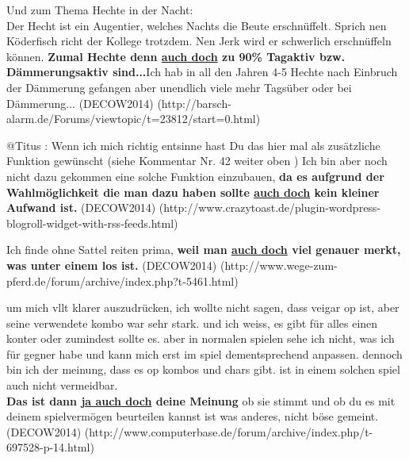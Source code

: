 {\begin{exe}
	\ex\label{1181} 
	\scriptsize
	Und zum Thema Hechte in der Nacht:\\
	Der Hecht ist ein Augentier, welches Nachts die Beute erschnüffelt. Sprich nen Köderfisch richt der Kollege trotzdem. Nen Jerk wird er schwerlich 			erschnüffeln können. \textbf{Zumal Hechte denn \underline{auch doch} zu 90\% Tagaktiv bzw. Dämmerungsaktiv sind...}Ich hab in all den Jahren 4-5 Hechte 	nach Einbruch der Dämmerung gefangen aber unendlich viele mehr Tagsüber oder bei Dämmerung...
	\newline
	\hbox{}\hfill\hbox{(DECOW2014)}	
	\newline
	\hbox{}\hfill\hbox{(http://barsch-alarm.de/Forums/viewtopic/t=23812/start=0.html)}
\end{exe}						  
						
\begin{exe}
	\ex\label{1182} 
	\scriptsize
	@Titus : Wenn ich mich richtig entsinne hast Du das hier mal als zusätzliche Funktion gewünscht (siehe Kommentar Nr. 42 weiter oben ) Ich bin aber noch 	nicht dazu gekommen eine solche Funktion einzubauen, \textbf{da es aufgrund der Wahlmöglichkeit die man dazu haben sollte \underline{auch doch} kein 		kleiner Aufwand ist.} 
	\hfill\hbox{(DECOW2014)}	
	\newline
	\hbox{}\hfill\hbox{(http://www.crazytoast.de/plugin-wordpress-blogroll-widget-with-rss-feeds.html)}
\end{exe}	

\begin{exe}
	\ex\label{1183} 
	\scriptsize
	Ich finde ohne Sattel reiten prima, \textbf{weil man \underline{auch doch} viel genauer merkt, was unter einem los ist.} 
	\hfill\hbox{(DECOW2014)}	
	\newline
	\hbox{}\hfill\hbox{(http://www.wege-zum-pferd.de/forum/archive/index.php?t-5461.html)}
\end{exe}	

\begin{exe}
	\ex\label{1184} 
	\scriptsize
	um mich vllt klarer auszudrücken, ich wollte nicht sagen, dass veigar op ist, aber seine verwendete kombo war sehr stark. und ich weiss, es gibt für 		alles einen konter oder zumindest sollte es. aber in normalen spielen sehe ich nicht, was ich für gegner habe und kann mich erst im spiel 					dem\-entsprechend anpassen. dennoch bin ich der meinung, dass es op kombos und chars gibt. ist in einem solchen spiel auch nicht vermeidbar.\\	
	\noindent
	\textbf{Das ist dann \underline{ja auch doch} deine Meinung} ob sie stimmt und ob du es mit deinem spielvermögen beurteilen kannst ist was anderes, 		nicht böse gemeint.	 
	\hfill\hbox{(DECOW2014)}	
	\newline
	\hbox{}\hfill\hbox{(http://www.computerbase.de/forum/archive/index.php/t-697528-p-14.html)}
\end{exe}

}
